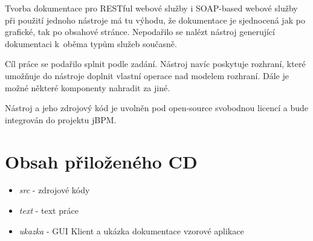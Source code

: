 \documentclass[11pt,twoside,a4paper]{book}
\begin{document}
Tvorba dokumentace pro RESTful webové služby i SOAP-based webové služby při
použití jednoho nástroje má tu výhodu, že dokumentace je sjednocená jak po
grafické, tak po obsahové stránce.
Nepodařilo se nalézt nástroj generující dokumentaci k~oběma typům služeb
současně.

Cíl práce se podařilo splnit podle zadání. Nástroj navíc poskytuje rozhraní,
které umožňuje do nástroje doplnit vlastní operace nad modelem rozhraní. Dále je
možné některé komponenty nahradit za jiné.

Nástroj a jeho zdrojový kód je uvolněn pod open-source svobodnou licencí a bude
integrován do projektu jBPM.


 
 

%

\appendix




\chapter{Obsah přiloženého CD}

\begin{itemize}
  \item {\em src} - zdrojové kódy
  \item {\em text} - text práce
  \item {\em ukazka} - GUI Klient a ukázka dokumentace vzorové aplikace
\end{itemize}
\end{document}
